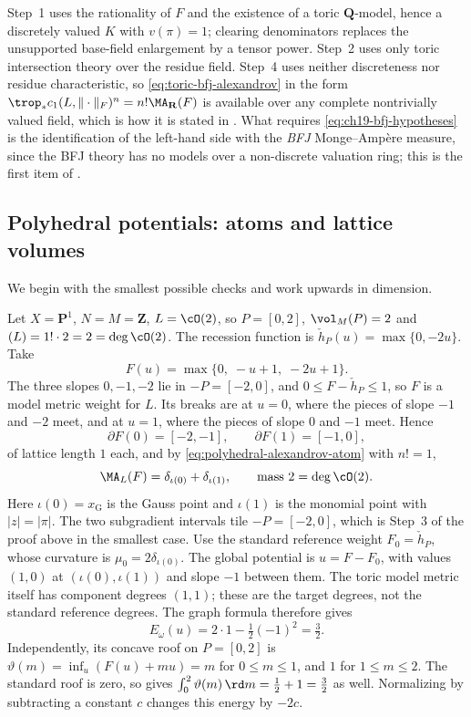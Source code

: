 \begin{remark}
\label{rem:ch31-toric-hypotheses}
Step~1 uses the rationality of $F$ and the existence of a toric
$\mathbf Q$-model, hence a discretely valued $K$ with $v(\pi)=1$;
clearing denominators replaces the unsupported base-field enlargement by a
tensor power.
Step~2 uses only toric intersection theory over the residue field.  Step~4
uses neither discreteness nor residue characteristic, so
\eqref{eq:toric-bfj-alexandrov} in the form
$\trop_*c_1(L,\|\cdot\|_F)^n=n!\MA_{\mathbf R}(F)$ is available over any
complete nontrivially valued field, which is how it is stated in
.  What requires \eqref{eq:ch19-bfj-hypotheses} is
the identification of the left-hand side with the \emph{BFJ}
Monge--Amp\`ere measure, since the BFJ theory has no models over a
non-discrete valuation ring; this is the first item of
.
\end{remark}

\subsection{Polyhedral potentials: atoms and lattice volumes}
\label{sec:ch31-toric-polyhedral}

We begin with the smallest possible checks and work upwards in dimension.

\begin{example}
\label{ex:ch31-toric-p1-two-atoms}
Let $X=\mathbf P^1$, $N=M=\mathbf Z$, $L=\cO(2)$, so
$P=[0,2]$, $\vol_M(P)=2$ and $(L)=1!\cdot2=2=\deg\cO(2)$.  The
recession function is $\check h_P(u)=\max\{0,-2u\}$.  Take
\[
 F(u)=\max\{0,\;-u+1,\;-2u+1\}.
\]
The three slopes $0,-1,-2$ lie in $-P=[-2,0]$, and
$0\leq F-\check h_P\leq1$, so $F$ is a model metric weight for $L$.
Its breaks are at $u=0$, where the pieces of slope $-1$ and $-2$
meet, and at $u=1$, where the pieces of slope $0$ and $-1$ meet.
Hence
\[
 \partial F(0)=[-2,-1],\qquad \partial F(1)=[-1,0],
\]
of lattice length $1$ each, and by
\eqref{eq:polyhedral-alexandrov-atom} with $n!=1$,
\[
 \MA_L(F)=\delta_{\iota(0)}+\delta_{\iota(1)},
 \qquad\text{mass }2=\deg\cO(2).
\]
Here $\iota(0)=x_{\mathrm G}$ is the Gauss point and $\iota(1)$ is the
monomial point with $|z|=|\pi|$.  The two subgradient intervals tile
$-P=[-2,0]$, which is Step~3 of the proof above in the smallest case.
Use the standard reference weight $F_0=\check h_P$, whose curvature is
$\mu_0=2\delta_{\iota(0)}$.  The global potential is $u=F-F_0$, with
values $(1,0)$ at $(\iota(0),\iota(1))$ and slope $-1$ between them.
The toric model metric itself has component degrees $(1,1)$; these are
the target degrees, not the standard reference degrees.  The graph formula
therefore gives
\[
 E_\omega(u)=2\cdot1-\tfrac12(-1)^2=\tfrac32.
\]
Independently, its concave roof on $P=[0,2]$ is
$\vartheta(m)=\inf_u(F(u)+mu)=m$ for $0\leq m\leq1$, and $1$ for
$1\leq m\leq2$.  The standard roof is zero, so
 gives
$\int_0^2\vartheta(m)\,\rd m=\tfrac12+1=\tfrac32$ as well.
Normalizing by subtracting a constant $c$ changes this energy by $-2c$.
\end{example}

